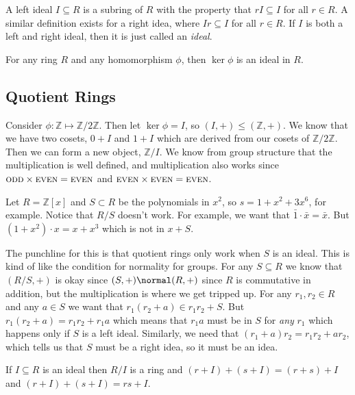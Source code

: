 \begin{definition}[Ideals]
A left ideal $I \subseteq R$ is a subring of $R$ with the property that $rI \subseteq I$ for all $r \in R$. A similar definition exists for a right idea, where $Ir \subseteq I$ for all $r \in R$. If $I$ is both a left and right ideal, then it is just called an \emph{ideal}.
\end{definition}

\begin{example}
For any ring $R$ and any homomorphism $\phi$, then $\ker \phi$ is an ideal in $R$.
\end{example}

\subsection{Quotient Rings}

Consider $\phi : \mathbb{Z} \mapsto \mathbb{Z}/2\mathbb{Z}$. Then let $\ker\phi = I$, so $(I,+) \leq (\mathbb{Z},+)$. We know that we have two cosets, $0 + I$ and $1 + I$ which are derived from our cosets of $\mathbb{Z}/2\mathbb{Z}$. Then we can form a new object, $\mathbb{Z}/I$. We know from group structure that the multiplication is well defined, and multiplication also works since $\textsc{odd} \times \textsc{even} = \textsc{even}$ and $\textsc{even} \times \textsc{even} = \textsc{even}$.

\begin{example}
Let $R = \mathbb{Z}[x]$ and $S \subset R$ be the polynomials in $x^2$, so $s = 1 + x^2 + 3x^6$, for example. Notice that $R/S$ doesn't work. For example, we want that $\bar{1} \cdot \bar{x} = \bar{x}$. But $(1 + x^2) \cdot x = x + x^3$ which is not in $x + S$.
\end{example}

The punchline for this is that quotient rings only work when $S$ is an ideal. This is kind of like the condition for normality for groups. For any $S \subseteq R$ we know that $(R/S,+)$ is okay since $(S,+) \normal (R,+)$ since $R$ is commutative in addition, but the multiplication is where we get tripped up. For any $r_1,r_2 \in R$ and any $a \in S$ we want that $r_1(r_2 + a) \in r_1r_2 + S$. But $r_1(r_2 + a) = r_1r_2 + r_1a$ which means that $r_1a$ must be in $S$ for \emph{any} $r_1$ which happens only if $S$ is a left  ideal. Similarly, we need that $(r_1 + a)r_2 = r_1r_2 + ar_2$, which tells us that $S$ must be a right idea, so it must be an idea.

\begin{proposition}
If $I \subseteq R$ is an ideal then $R/I$ is a ring and $(r + I) + (s + I) = (r+s) + I$ and $(r+I) + (s + I) = rs + I$.
\end{proposition}

